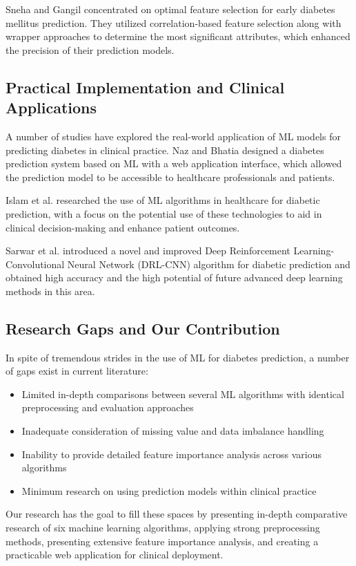 \documentclass[conference]{IEEEtran}
\begin{document}
Sneha and Gangil \cite{sneha2019} concentrated on optimal feature selection for early diabetes mellitus prediction. They utilized correlation-based feature selection along with wrapper approaches to determine the most significant attributes, which enhanced the precision of their prediction models.

\subsection{Practical Implementation and Clinical Applications}
A number of studies have explored the real-world application of ML models for predicting diabetes in clinical practice. Naz and Bhatia \cite{naz2023} designed a diabetes prediction system based on ML with a web application interface, which allowed the prediction model to be accessible to healthcare professionals and patients.

Islam et al. \cite{islam2018} researched the use of ML algorithms in healthcare for diabetic prediction, with a focus on the potential use of these technologies to aid in clinical decision-making and enhance patient outcomes.

Sarwar et al. \cite{sarwar2024} introduced a novel and improved Deep Reinforcement Learning-Convolutional Neural Network (DRL-CNN) algorithm for diabetic prediction and obtained high accuracy and the high potential of future advanced deep learning methods in this area.

\subsection{Research Gaps and Our Contribution}
In spite of tremendous strides in the use of ML for diabetes prediction, a number of gaps exist in current literature:

\begin{itemize}
    \item Limited in-depth comparisons between several ML algorithms with identical preprocessing and evaluation approaches
    \item Inadequate consideration of missing value and data imbalance handling
    \item Inability to provide detailed feature importance analysis across various algorithms
\item Minimum research on using prediction models within clinical practice
\end{itemize}

Our research has the goal to fill these spaces by presenting in-depth comparative research of six machine learning algorithms, applying strong preprocessing methods, presenting extensive feature importance analysis, and creating a practicable web application for clinical deployment.
\end{document}
